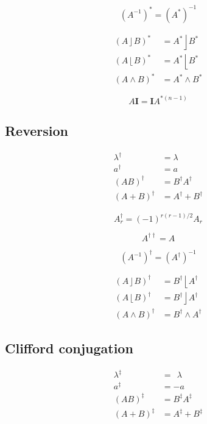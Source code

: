 \documentclass{utarticle}
\newcommand{\bl}[1]{\ensuremath{\bm{#1}}}
\newcommand{\I}{\bl{I}}
\DeclareMathOperator{\lin}{\rfloor}
\DeclareMathOperator{\rin}{\lfloor}
\DeclareMathOperator{\out}{\wedge}
\newcommand{\grinv}[2][]{\ensuremath{#2^{*#1}}}
\newcommand{\rev}[1]{\ensuremath{#1^\dagger}}
\newcommand{\doublerev}[1]{\ensuremath{#1^{\dagger\dagger}}}
\newcommand{\clifconj}[1]{\ensuremath{#1^\ddagger}}
\begin{document}
\begin{equation} \grinv{(A^{-1})} = (\grinv{A})^{-1} \end{equation}

\begin{align}
\grinv{(A \lin B)} & = \grinv{A} \lin \grinv{B} \\
\grinv{(A \rin B)} & = \grinv{A} \rin \grinv{B} \\
\grinv{(A \out B)} & = \grinv{A} \out \grinv{B}
\end{align}

\begin{equation} A \I = \I \grinv[(n-1)]{A} \end{equation}

\subsection{Reversion}
\label{app:reverse}

\begin{align}
\rev{\lambda} & = \lambda  \\
\rev{a} & = a  \\
\rev{(AB)} & = \rev{B} \rev{A} \\
\rev{(A + B)} & = \rev{A} + \rev{B}
\end{align}

\begin{equation} \rev{A_r} = (-1)^{r(r-1)/2} A_r \end{equation}

\begin{equation} \doublerev{A} = A \end{equation} 

\begin{equation} \rev{(A^{-1})} = (\rev{A})^{-1} \end{equation}

\begin{align}
\rev{(A \lin B)} & = \rev{B} \rin \rev{A} \\
\rev{(A \rin B)} & = \rev{B} \lin \rev{A} \\
\rev{(A \out B)} & = \rev{B} \out \rev{A}
\end{align}

\subsection{Clifford conjugation}
\label{app:clifconj}

\begin{align}
\clifconj{\lambda} & = \ \ \lambda \\
\clifconj{a} & = -a \\
\clifconj{(AB)} & = \clifconj{B} \clifconj{A} \\
\clifconj{(A + B)} & = \clifconj{A} + \clifconj{B}
\end{align}
\end{document}
